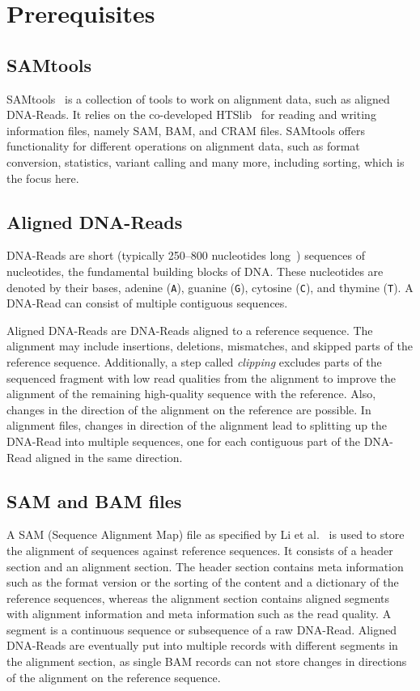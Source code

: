 \section{Prerequisites}

\subsection{SAMtools}
SAMtools~\cite{12ySamtools} is a collection of tools to work on alignment data, such as aligned DNA-Reads. It relies on the co-developed HTSlib~\cite{bonfield_htslib_2021} for reading and writing information files, namely SAM, BAM, and CRAM files. SAMtools offers functionality for different operations on alignment data, such as format conversion, statistics, variant calling and many more, including sorting, which is the focus here. 

\subsection{Aligned DNA-Reads}
DNA-Reads are short (typically 250–800 nucleotides long~\cite{hu_next-generation_2021}) sequences of nucleotides, the fundamental building blocks of DNA. These nucleotides are denoted by their bases, adenine (\texttt{A}), guanine (\texttt{G}), cytosine (\texttt{C}), and thymine (\texttt{T}). A DNA-Read can consist of multiple contiguous sequences. 

Aligned DNA-Reads are DNA-Reads aligned to a reference sequence. The alignment may include insertions, deletions, mismatches, and skipped parts of the reference sequence. Additionally, a step called \textit{clipping} excludes parts of the sequenced fragment with low read qualities from the alignment to improve the alignment of the remaining high-quality sequence with the reference. Also, changes in the direction of the alignment on the reference are possible. In alignment files, changes in direction of the alignment lead to splitting up the DNA-Read into multiple sequences, one for each contiguous part of the DNA-Read aligned in the same direction.

\subsection{SAM and BAM files}
A SAM (Sequence Alignment Map) file as specified by Li et al.~\cite{samformat} is used to store the alignment of sequences against reference sequences. It consists of a header section and an alignment section. The header section contains meta information such as the format version or the sorting of the content and a dictionary of the reference sequences, whereas the alignment section contains aligned segments with alignment information and meta information such as the read quality. A segment is a continuous sequence or subsequence of a raw DNA-Read. Aligned DNA-Reads are eventually put into multiple records with different segments in the alignment section, as single BAM records can not store changes in directions of the alignment on the reference sequence.

